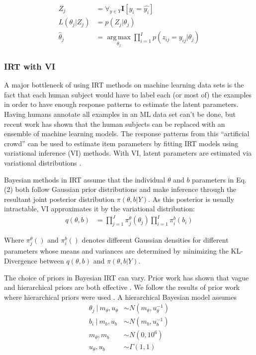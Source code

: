 \documentclass[letterpaper]{article} %
\begin{document}
\begin{align}
Z_j &= \forall_{y \in Y} \mathbf{I}[y_i = \hat{y_i}] \\
L(\theta_j \vert Z_j) &= p(Z_j \vert \theta_j)  \\
\hat{\theta}_j &= \operatorname*{arg\,max}_{\theta_j}  \prod_{i=1}^I p(z_{ij}=y_{ij} \vert \theta_j) 
\end{align}


\subsubsection{IRT with VI} 
A major bottleneck of using IRT methods on machine learning data sets is the fact that each human subject would have to label each (or most of) the examples in order to have enough response patterns to estimate the latent parameters.
Having humans annotate all examples in an ML data set can't be done, but recent work has shown that the human subjects can be replaced with an ensemble of machine learning models. 
The response patterns from this ``artificial crowd'' can be used to estimate item parameters by fitting IRT models using variational inference (VI) methods.
With VI, latent parameters are estimated via variational distributions \cite{natesan_bayesian_2016,lalor_learning_2019}. 

Bayesian methods in IRT assume that the individual $\theta$ and $b$ parameters in Eq. (2) both follow Gaussian prior distributions and make inference through the resultant joint posterior distribution $\pi(\theta,b|Y)$. As this posterior is usually intractable, VI approximates it by the variational distribution:
\begin{align} 
q(\theta, b) &=  \prod_{j=1}^J \pi^\theta_j(\theta_j) \prod_{i=1}^I \pi^b_i(b_i)
\end{align} 

Where $\pi^\theta_j()$ and $\pi^b_i()$ denotes different Gaussian densities for different parameters whose means and variances are determined by minimizing the KL-Divergence between $q(\theta,b)$ and $\pi(\theta,b|Y)$.

The choice of priors in Bayesian IRT can vary.
Prior work has shown that vague and hierarchical priors are both effective \cite{natesan_bayesian_2016}.
We follow the results of prior work where hierarchical priors were used \cite{lalor_learning_2019}.
A hierarchical Bayesian model assumes
\begin{align*}
\theta_j\ |\ m_\theta, u_\theta &\sim N(m_{\theta}, u^{-1}_{\theta}) \\
b_i\ |\ m_b, u_b &\sim N(m_b, u^{-1}_b) \\
m_{\theta}, m_{b} &\sim N(0, 10^6) \\
u_{\theta}, u_b &\sim \Gamma(1, 1)
\end{align*}
\end{document}

